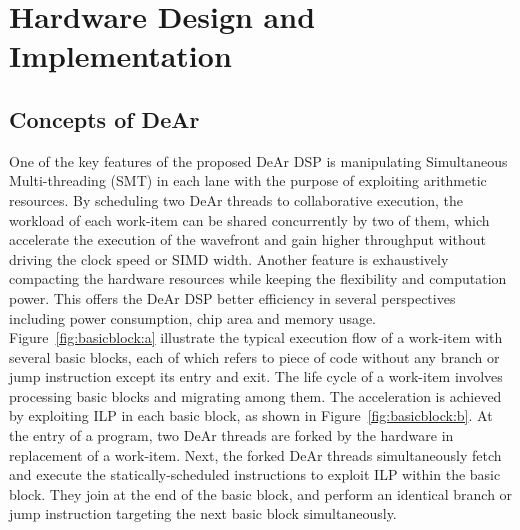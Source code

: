 \chapter{Hardware Design and Implementation}
\section{Concepts of DeAr}
\indent 
One of the key features of the proposed DeAr DSP is manipulating Simultaneous Multi-threading (SMT) in each lane with the purpose of exploiting arithmetic resources.
By scheduling two DeAr threads to collaborative execution, the workload of each work-item can be shared concurrently by two of them, 
which accelerate the execution of the wavefront and gain higher throughput without driving the clock speed or SIMD width.
Another feature is exhaustively compacting the hardware resources while keeping the flexibility and computation power.
This offers the DeAr DSP better efficiency in several perspectives including power consumption, chip area and memory usage.
\\\indent Figure~\ref{fig:basicblock:a} illustrate the typical execution flow of a work-item with several basic blocks, 
each of which refers to piece of code without any branch or jump instruction except its entry and exit.
The life cycle of a work-item involves processing basic blocks and migrating among them.
The acceleration is achieved by exploiting ILP in each basic block, as shown in Figure~\ref{fig:basicblock:b}. 
At the entry of a program, two DeAr threads are forked by the hardware in replacement of a work-item.
Next, the forked DeAr threads simultaneously fetch and execute the statically-scheduled instructions to exploit ILP within the basic block.
They join at the end of the basic block, and perform an identical branch or jump instruction targeting the next basic block simultaneously.
